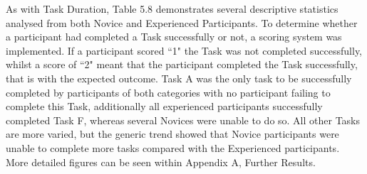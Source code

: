 As with Task Duration, Table 5.8 demonstrates several descriptive statistics analysed from both Novice and Experienced Participants. To determine whether a participant had completed a Task successfully or not, a scoring system was implemented. If a participant scored ``1" the Task was not completed successfully, whilst a score of ``2" meant that the participant completed the Task successfully, that is with the expected outcome. Task A was the only task to be successfully completed by participants of both categories with no participant failing to complete this Task, additionally all experienced participants successfully completed Task F, whereas several Novices were unable to do so. All other Tasks are more varied, but the generic trend showed that Novice participants were unable to complete more tasks compared with the Experienced participants. More detailed figures can be seen within Appendix A, Further Results.








